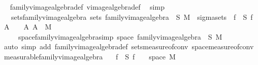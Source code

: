 \begin{isabellebody}
\isadelimproof
\ %
\endisadelimproof
%
\isatagproof
{}\isamarkupfalse%
\ family{\isacharunderscore}{\kern0pt}vimage{\isacharunderscore}{\kern0pt}algebra{\isacharunderscore}{\kern0pt}def\ vimage{\isacharunderscore}{\kern0pt}algebra{\isacharunderscore}{\kern0pt}def\ \isamarkupfalse%
\ simp%
\endisatagproof
{\isafoldproof}%
%
\isadelimproof
%
\endisadelimproof
\isanewline
\isanewline
{}\isamarkupfalse%
\isanewline
\ \ \ sets{\isacharunderscore}{\kern0pt}family{\isacharunderscore}{\kern0pt}vimage{\isacharunderscore}{\kern0pt}algebra{\isacharcolon}{\kern0pt}\ {\isachardoublequoteopen}sets\ {\isacharparenleft}{\kern0pt}family{\isacharunderscore}{\kern0pt}vimage{\isacharunderscore}{\kern0pt}algebra\ {\isasymOmega}\ S\ M{\isacharparenright}{\kern0pt}\ {\isacharequal}{\kern0pt}\ sigma{\isacharunderscore}{\kern0pt}sets\ {\isasymOmega}\ {\isacharparenleft}{\kern0pt}{\isasymUnion}f\ {\isasymin}\ S{\isachardot}{\kern0pt}\ {\isacharbraceleft}{\kern0pt}f\ {\isacharminus}{\kern0pt}{\isacharbackquote}{\kern0pt}\ A\ {\isasyminter}\ {\isasymOmega}\ {\isacharbar}{\kern0pt}\ A{\isachardot}{\kern0pt}\ A\ {\isasymin}\ M{\isacharbraceright}{\kern0pt}{\isacharparenright}{\kern0pt}{\isachardoublequoteclose}\ \isanewline
\ \ \ \ \ space{\isacharunderscore}{\kern0pt}family{\isacharunderscore}{\kern0pt}vimage{\isacharunderscore}{\kern0pt}algebra{\isacharbrackleft}{\kern0pt}simp{\isacharbrackright}{\kern0pt}{\isacharcolon}{\kern0pt}\ {\isachardoublequoteopen}space\ {\isacharparenleft}{\kern0pt}family{\isacharunderscore}{\kern0pt}vimage{\isacharunderscore}{\kern0pt}algebra\ {\isasymOmega}\ S\ M{\isacharparenright}{\kern0pt}\ {\isacharequal}{\kern0pt}\ {\isasymOmega}{\isachardoublequoteclose}\isanewline
%
\isadelimproof
\ \ %
\endisadelimproof
%
\isatagproof
{}\isamarkupfalse%
\ {\isacharparenleft}{\kern0pt}auto\ simp\ add{\isacharcolon}{\kern0pt}\ family{\isacharunderscore}{\kern0pt}vimage{\isacharunderscore}{\kern0pt}algebra{\isacharunderscore}{\kern0pt}def\ sets{\isacharunderscore}{\kern0pt}measure{\isacharunderscore}{\kern0pt}of{\isacharunderscore}{\kern0pt}conv\ space{\isacharunderscore}{\kern0pt}measure{\isacharunderscore}{\kern0pt}of{\isacharunderscore}{\kern0pt}conv{\isacharparenright}{\kern0pt}%
\endisatagproof
{\isafoldproof}%
%
\isadelimproof
\isanewline
%
\endisadelimproof
\isanewline
{}\isamarkupfalse%
\ measurable{\isacharunderscore}{\kern0pt}family{\isacharunderscore}{\kern0pt}vimage{\isacharunderscore}{\kern0pt}algebra{\isacharcolon}{\kern0pt}\isanewline
\ \ \ {\isachardoublequoteopen}f\ {\isasymin}\ S{\isachardoublequoteclose}\ {\isachardoublequoteopen}f\ {\isasymin}\ {\isasymOmega}\ {\isasymrightarrow}\ space\ M{\isachardoublequoteclose}\isanewline

\end{isabellebody}
